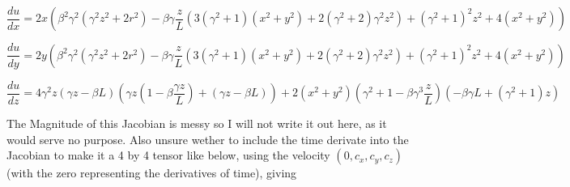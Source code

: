 \begin{equation}
	\frac{du}{dx} = 2x \left( \beta^2 \gamma^2 (\gamma^2z^2 +2r^2) - \beta \gamma \frac{z}{L} \left( 3(\gamma^2+1)(x^2+y^2) + 2(\gamma^2+2)\gamma^2z^2 \right) + (\gamma^2+1)^2z^2 + 4(x^2+y^2) \right)
\end{equation}

\begin{equation}
	\frac{du}{dy} = 2y \left( \beta^2 \gamma^2 (\gamma^2z^2 +2r^2) - \beta \gamma \frac{z}{L} \left( 3(\gamma^2+1)(x^2+y^2) + 2(\gamma^2+2)\gamma^2z^2 \right) + (\gamma^2+1)^2z^2 + 4(x^2+y^2) \right)
\end{equation}

\begin{equation}
	\frac{du}{dz} = 4\gamma^2 z (\gamma z -\beta L) \left( \gamma z(1-\beta\frac{\gamma z}{L}) + (\gamma z -\beta L) \right) +
	2(x^2+y^2)(\gamma^2+1-\beta\gamma^3\frac{z}{L})(-\beta\gamma L + (\gamma^2+1)z )
\end{equation}





The Magnitude of this Jacobian is messy so I will not write it out here, as it would serve no purpose.
Also unsure wether to include the time derivate into the Jacobian to make it a 4 by 4 tensor like below, using the velocity $( 0 , c_x , c_y , c_z )$ (with the zero representing the derivatives of time), giving


